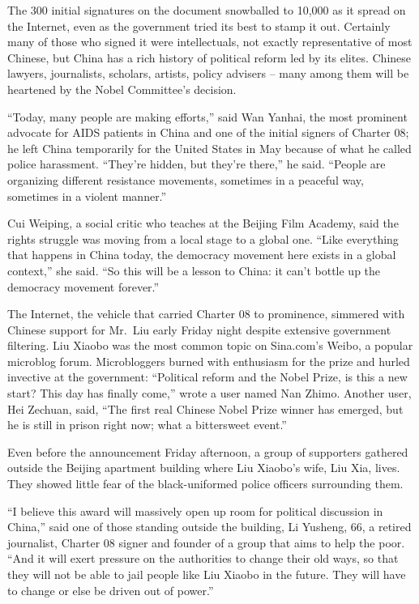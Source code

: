 ﻿\documentclass[12pt]{article}
\begin{document}
The 300 initial signatures on the document snowballed to 10,000 as it spread on the Internet, even
as the government tried its best to stamp it out. Certainly many of those who signed it were
intellectuals, not exactly representative of most Chinese, but China has a rich history of political
reform led by its elites. Chinese lawyers, journalists, scholars, artists, policy advisers -- many
among them will be heartened by the Nobel Committee's decision.

``Today, many people are making efforts,'' said Wan Yanhai, the most prominent advocate for AIDS
patients in China and one of the initial signers of Charter 08; he left China temporarily for the
United States in May because of what he called police harassment. ``They're hidden, but they're
there,'' he said. ``People are organizing different resistance movements, sometimes in a peaceful
way, sometimes in a violent manner.''

Cui Weiping, a social critic who teaches at the Beijing Film Academy, said the rights struggle was
moving from a local stage to a global one. ``Like everything that happens in China today, the
democracy movement here exists in a global context,'' she said. ``So this will be a lesson to China:
it can't bottle up the democracy movement forever.''

The Internet, the vehicle that carried Charter 08 to prominence, simmered with Chinese support for
Mr.~Liu early Friday night despite extensive government filtering. Liu Xiaobo was the most common
topic on Sina.com's Weibo, a popular microblog forum. Microbloggers burned with enthusiasm for the
prize and hurled invective at the government: ``Political reform and the Nobel Prize, is this a new
start? This day has finally come,'' wrote a user named Nan Zhimo. Another user, Hei Zechuan, said,
``The first real Chinese Nobel Prize winner has emerged, but he is still in prison right now; what a
bittersweet event.''

Even before the announcement Friday afternoon, a group of supporters gathered outside the Beijing
apartment building where Liu Xiaobo's wife, Liu Xia, lives. They showed little fear of the
black-uniformed police officers surrounding them.

``I believe this award will massively open up room for political discussion in China,'' said one of
those standing outside the building, Li Yusheng, 66, a retired journalist, Charter 08 signer and
founder of a group that aims to help the poor. ``And it will exert pressure on the authorities to
change their old ways, so that they will not be able to jail people like Liu Xiaobo in the future.
They will have to change or else be driven out of power.''
\end{document}
